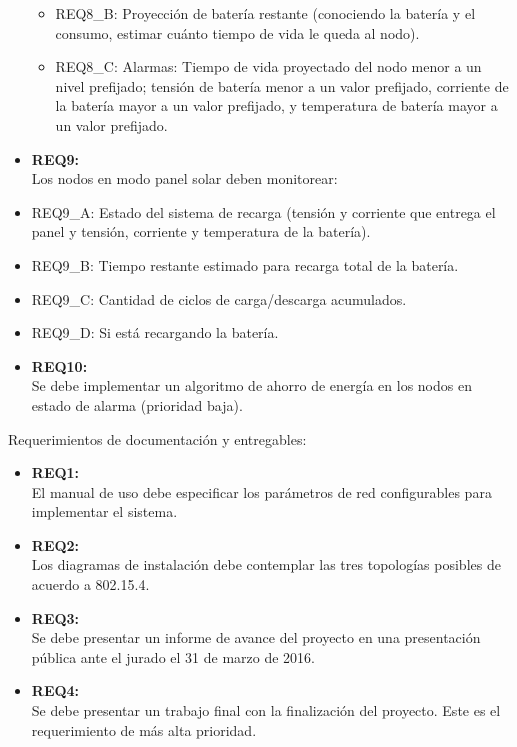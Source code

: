 \begin{itemize}
\begin{itemize}
		\item REQ8\_B: Proyección de batería restante (conociendo la batería y el consumo, estimar cuánto tiempo de vida le queda al nodo).
		\item REQ8\_C: Alarmas: Tiempo de vida proyectado del nodo menor a un nivel prefijado; tensión de batería menor a un valor prefijado, corriente de la batería mayor a un valor prefijado, y temperatura de batería mayor a un valor prefijado.
		\end{itemize}
	\item \textbf{REQ9:}\\Los nodos en modo panel solar deben monitorear:
		\item REQ9\_A: Estado del sistema de recarga (tensión y corriente que entrega el panel y tensión, corriente y temperatura de la batería).
		\item REQ9\_B: Tiempo restante estimado para recarga total de la batería.
		\item REQ9\_C: Cantidad de ciclos de carga/descarga acumulados.
		\item REQ9\_D: Si está recargando la batería.
	\item \textbf{REQ10:}\\Se debe implementar un algoritmo de ahorro de energía en los nodos en estado de alarma (prioridad baja).
\end{itemize}

\noindent Requerimientos de documentación y entregables:
\begin{itemize}
	\item \textbf{REQ1:}\\ El manual de uso debe especificar los parámetros de red configurables para implementar el sistema.
	\item \textbf{REQ2:}\\ Los diagramas de instalación debe contemplar las tres topologías posibles de acuerdo a 802.15.4.
	\item \textbf{REQ3:}\\ Se debe presentar un informe de avance del proyecto en una presentación pública ante el jurado el 31 de marzo de 2016.
	\item \textbf{REQ4:}\\ Se debe presentar un trabajo final con la finalización del proyecto. Este es el requerimiento de más alta prioridad.	
\end{itemize}


